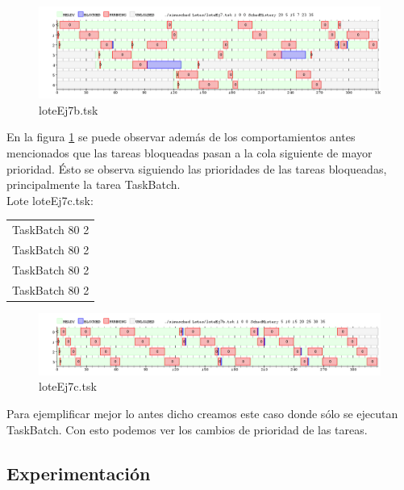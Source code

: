 \begin{figure}[H]
  \centering
    \includegraphics[width=1.1\textwidth]{imagenes/test1ej7.png}
  \caption{loteEj7b.tsk}
  \label{fig:ej7b}
\end{figure}

En la figura \ref{fig:ej7b} se puede observar adem\'as de los comportamientos antes mencionados que las tareas bloqueadas pasan a la cola siguiente 
de mayor prioridad. \'Esto se observa siguiendo las prioridades de las tareas bloqueadas, principalmente la tarea TaskBatch.\\



Lote loteEj7c.tsk:
\begin{table}[H]
\begin{tabular}{ | l |}
  \hline
TaskBatch 80 2\\
TaskBatch 80 2\\
TaskBatch 80 2\\
TaskBatch 80 2\\
  \hline
\end{tabular}
\end{table}

\begin{figure}[H]
  \centering
    \includegraphics[width=1.1\textwidth]{imagenes/test2ej7.png}
  \caption{loteEj7c.tsk}
  \label{fig:ej7c}
\end{figure}


Para ejemplificar mejor lo antes dicho creamos este caso donde s\'olo se ejecutan TaskBatch. Con esto podemos ver los cambios de prioridad de las tareas.


\subsection{Experimentación}
